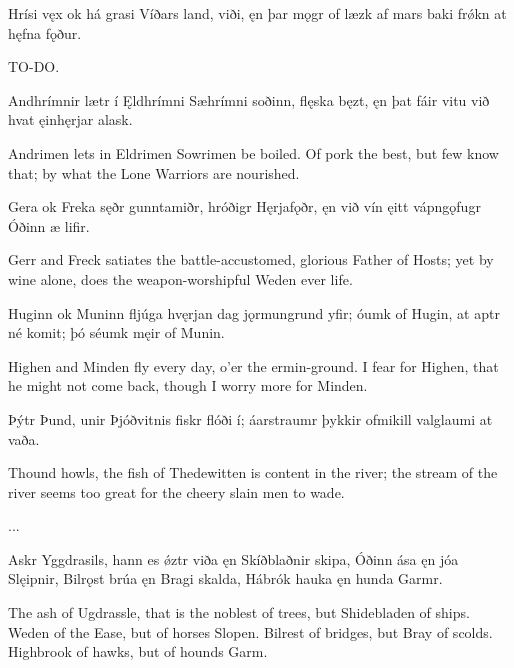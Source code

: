Hrísi vęx \hld ok há grasi
\ind Víðars land, viði,
ęn þar mǫgr of læzk \hld af mars baki
\ind frǿkn at hęfna fǫður.

\bvb TO-DO.

Andhrímnir \hld lætr í Ęldhrímni
\ind Sæhrímni soðinn,
flęska bęzt, \hld ęn þat fáir vitu
\ind við hvat ęinhęrjar alask.

\bvb Andrimen lets in Eldrimen Sowrimen be boiled. Of pork the best, but few know that; by what the Lone Warriors are nourished.\footnotemark[1]

Gera ok Freka \hld sęðr gunntamiðr,
\ind hróðigr Hęrjafǫðr,
ęn við vín ęitt \hld vápngǫfugr
\ind Óðinn æ lifir. 

\bvb Gerr and Freck satiates the battle-accustomed, glorious Father of Hosts; yet by wine alone, does the weapon-worshipful Weden ever life.

Huginn ok Muninn \hld fljúga hvęrjan dag
\ind jǫrmungrund yfir;
óumk of Hugin, \hld at aptr né komit;
\ind þó séumk męir of Munin.

\bvb Highen and Minden fly every day, o'er the ermin-ground. I fear for Highen, that he might not come back, though I worry more for Minden.

Þýtr Þund, \hld unir Þjóðvitnis
\ind fiskr flóði í;
áarstraumr \hld þykkir ofmikill
\ind valglaumi at vaða.

\bvb Thound howls, the fish of Thedewitten is content in the river; the stream of the river seems too great for the cheery slain men to wade.

...

Askr Yggdrasils, \hld hann es ǿztr viða
\ind ęn Skíðblaðnir skipa,
Óðinn ása \hld ęn jóa Slęipnir,
Bilrǫst brúa \hld ęn Bragi skalda,
Hábrók hauka \hld ęn hunda Garmr. 

\bvb The ash of Ugdrassle, that is the noblest of trees, but Shidebladen of ships. Weden of the Ease, but of horses Slopen. Bilrest of bridges, but Bray of scolds. Highbrook of hawks, but of hounds Garm.

